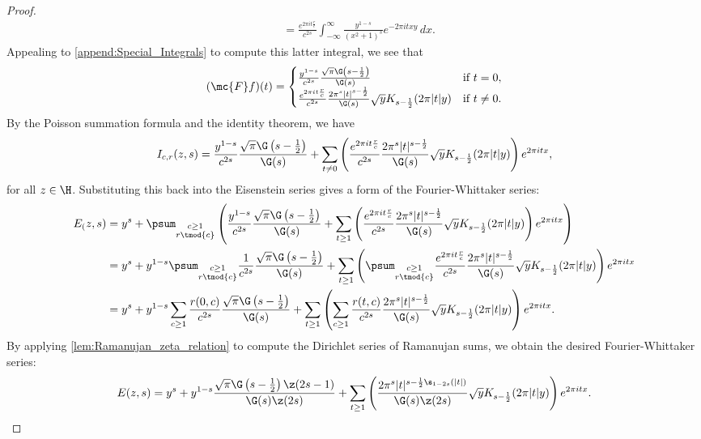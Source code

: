 \begin{proof}
\begin{align*}
          &= \frac{e^{2\pi it\frac{r}{c}}}{c^{2s}}\int_{-\infty}^{\infty}\frac{y^{1-s}}{(x^{2}+1)^{s}}e^{-2\pi itxy}\,dx.
        \end{align*}
        Appealing to \cref{append:Special_Integrals} to compute this latter integral, we see that
        \[
          (\mc{F}f)(t) = \begin{cases} \frac{y^{1-s}}{c^{2s}}\frac{\sqrt{\pi}\G\left(s-\frac{1}{2}\right)}{\G(s)} & \text{if $t = 0$}, \\ \frac{e^{2\pi it\frac{r}{c}}}{c^{2s}}\frac{2\pi^{s}|t|^{s-\frac{1}{2}}}{\G(s)}\sqrt{y}K_{s-\frac{1}{2}}(2\pi|t|y) & \text{if $t \neq 0$}. \end{cases}
        \]
        By the Poisson summation formula and the identity theorem, we have
        \[
          I_{c,r}(z,s) = \frac{y^{1-s}}{c^{2s}}\frac{\sqrt{\pi}\G\left(s-\frac{1}{2}\right)}{\G(s)}+\sum_{t \neq 0}\left(\frac{e^{2\pi it\frac{r}{c}}}{c^{2s}}\frac{2\pi^{s}|t|^{s-\frac{1}{2}}}{\G(s)}\sqrt{y}K_{s-\frac{1}{2}}(2\pi|t|y)\right)e^{2\pi itx},
        \]
        for all $z \in \H$. Substituting this back into the Eisenstein series gives a form of the Fourier-Whittaker series:
      \begin{align*}
        E_(z,s) &= y^{s}+\psum_{\substack{c \ge 1 \\ r \tmod{c}}}\left(\frac{y^{1-s}}{c^{2s}}\frac{\sqrt{\pi}\G\left(s-\frac{1}{2}\right)}{\G(s)}+\sum_{t \ge 1}\left(\frac{e^{2\pi it\frac{r}{c}}}{c^{2s}}\frac{2\pi^{s}|t|^{s-\frac{1}{2}}}{\G(s)}\sqrt{y}K_{s-\frac{1}{2}}(2\pi|t|y)\right)e^{2\pi itx}\right) \\
        &= y^{s}+y^{1-s}\psum_{\substack{c \ge 1 \\ r \tmod{c}}}\frac{1}{c^{2s}}\frac{\sqrt{\pi}\G\left(s-\frac{1}{2}\right)}{\G(s)}+\sum_{t \ge 1}\left(\psum_{\substack{c \ge 1 \\ r \tmod{c}}}\frac{e^{2\pi it\frac{r}{c}}}{c^{2s}}\frac{2\pi^{s}|t|^{s-\frac{1}{2}}}{\G(s)}\sqrt{y}K_{s-\frac{1}{2}}(2\pi|t|y)\right)e^{2\pi itx} \\
        &= y^{s}+y^{1-s}\sum_{c \ge 1}\frac{r(0,c)}{c^{2s}}\frac{\sqrt{\pi}\G\left(s-\frac{1}{2}\right)}{\G(s)}+\sum_{t \ge 1}\left(\sum_{c \ge 1}\frac{r(t,c)}{c^{2s}}\frac{2\pi^{s}|t|^{s-\frac{1}{2}}}{\G(s)}\sqrt{y}K_{s-\frac{1}{2}}(2\pi|t|y)\right)e^{2\pi itx}.
      \end{align*}
      By applying \cref{lem:Ramanujan_zeta_relation} to compute the Dirichlet series of Ramanujan sums, we obtain the desired Fourier-Whittaker series:
      \[
        E(z,s) = y^{s}+y^{1-s}\frac{\sqrt{\pi}\G\left(s-\frac{1}{2}\right)\z(2s-1)}{\G(s)\z(2s)}+\sum_{t \ge 1}\left(\frac{2\pi^{s}|t|^{s-\frac{1}{2}\s_{1-2s}(|t|)}}{\G(s)\z(2s)}\sqrt{y}K_{s-\frac{1}{2}}(2\pi|t|y)\right)e^{2\pi itx}.
      \]
      \end{proof}

